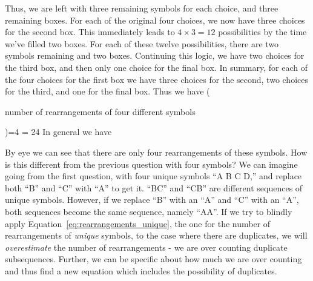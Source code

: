 Thus, we are left with three remaining symbols for each choice, and three remaining boxes. For each of the original four choices, we now have three choices for the second box.  This immediately leads to $4\times 3=12$ possibilities by the time we've filled two boxes.  For each of these twelve possibilities, there are two symbols remaining and two boxes.  Continuing this logic, we have two choices for the third box, and then only one choice for the final box.  In summary, for each of the four choices for the first box we have three choices for the second, two choices for the third, and one for the final box.  Thus we have
\beqn
\left(\parbox{1.6in}{number of rearrangements of four different symbols}\right)=4   = 24
\eeqn
In general we have


By eye we can see that there are only four rearrangements of these symbols.  How is this different from the previous question with four symbols?  We can imagine going from the first question, with four unique symbols ``A B C D,'' and replace both ``B'' and ``C'' with ``A'' to get it.   ``BC'' and ``CB'' are different sequences of unique symbols.  However, if we replace ``B'' with an ``A'' and ``C'' with an ``A'', both sequences become the same sequence, namely ``AA''.  If we try to blindly apply Equation~\ref{eq:rearrangements_unique}, the one for the number of rearrangements of {\em unique} symbols, to the case where there are duplicates, we will {\em overestimate} the number of rearrangements - we are over counting duplicate subsequences.  Further, we can be specific about how much we are over counting and thus find a new equation which includes the possibility of duplicates.

